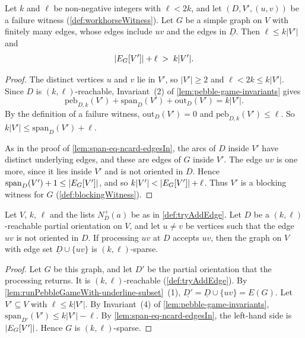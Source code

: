 \begin{lemma}
  \label{lem:workhorseWitness-certifies}
  \leanok
  Let $k$ and $\ell$ be non-negative integers with $\ell < 2k$, and let
  $(D, V', (u, v))$ be a failure witness (\cref{def:workhorseWitness}).
  Let $G$ be a simple graph on $V$ with finitely many edges, whose edges
  include $uv$ and the edges in $\underline{D}$. Then $\ell \le k|V'|$ and
  \[
    |\edgesIn[G]{V'}| + \ell \;>\; k|V'|.
  \]
\end{lemma}
\begin{proof}
  \leanok
  The distinct vertices $u$ and $v$ lie in $V'$, so $|V'| \ge 2$ and
  $\ell < 2k \le k|V'|$. Since $D$ is $(k, \ell)$-reachable,
  Invariant~(2) of \cref{lem:pebble-game-invariants} gives
  \[
    \mathrm{peb}_{D, k}(V') + \mathrm{span}_D(V') + \mathrm{out}_D(V')
    = k|V'|.
  \]
  By the definition of a failure witness, $\mathrm{out}_D(V') = 0$ and
  $\mathrm{peb}_{D, k}(V') \le \ell$. So
  $k|V'| \le \mathrm{span}_D(V') + \ell$.

  As in the proof of \cref{lem:span-eq-ncard-edgesIn}, the arcs of $D$
  inside $V'$ have distinct underlying edges, and these are edges of $G$
  inside $V'$. The edge $uv$ is one more, since it lies inside $V'$ and
  is not oriented in $D$. Hence
  $\mathrm{span}_D(V') + 1 \le |\edgesIn[G]{V'}|$, and so
  $k|V'| < |\edgesIn[G]{V'}| + \ell$. Thus $V'$ is a blocking witness
  for $G$ (\cref{def:blockingWitness}).
\end{proof}

\begin{lemma}
  \label{lem:pebble-game-tryAddEdgeWith-isSparse}
  \leanok
  Let $V$, $k$, $\ell$ and the lists $N^+_D(a)$ be as in
  \cref{def:tryAddEdge}. Let $D$ be a $(k, \ell)$-reachable partial
  orientation on $V$, and let $u \ne v$ be vertices such that the edge
  $uv$ is not oriented in $D$. If processing $uv$ at $D$ accepts $uv$,
  then the graph on $V$ with edge set $\underline{D} \cup \{uv\}$ is
  $(k, \ell)$-sparse.
\end{lemma}
\begin{proof}
  \leanok
  Let $G$ be this graph, and let $D'$ be the partial orientation that
  the processing returns. It is $(k, \ell)$-reachable
  (\cref{def:tryAddEdge}). By
  \cref{lem:runPebbleGameWith-underline-subset}~(1),
  $\underline{D'} = \underline{D} \cup \{uv\} = E(G)$. Let
  $V' \subseteq V$ with $\ell \le k|V'|$. By Invariant~(4) of
  \cref{lem:pebble-game-invariants},
  $\mathrm{span}_{D'}(V') \le k|V'| - \ell$. By
  \cref{lem:span-eq-ncard-edgesIn}, the left-hand side is
  $|\edgesIn[G]{V'}|$. Hence $G$ is $(k, \ell)$-sparse.
\end{proof}

